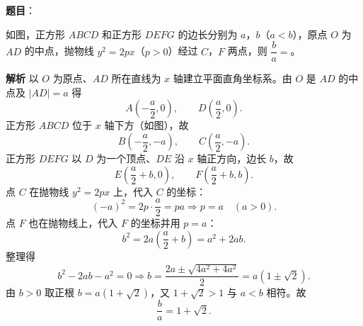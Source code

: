 \begin{answer}

\textbf{题目}：

如图，正方形 $ABCD$ 和正方形 $DEFG$ 的边长分别为 $a$，$b$（$a<b$），原点 $O$ 为 $AD$ 的中点，抛物线 $y^2=2px$（$p>0$）经过 $C$，$F$ 两点，则 $\dfrac ba=$\gkblank{}。
\nopagebreak[4]
\begin{center}\end{center}
\nopagebreak[4]
\textbf{解析}
以 $O$ 为原点、$AD$ 所在直线为 $x$ 轴建立平面直角坐标系。由 $O$ 是 $AD$ 的中点及 $|AD|=a$ 得
\nopagebreak[4]
\[A\left(-\frac a2,0\right),\qquad D\left(\frac a2,0\right).\]
正方形 $ABCD$ 位于 $x$ 轴下方（如图），故
\nopagebreak[4]
\[B\left(-\frac a2,-a\right),\qquad C\left(\frac a2,-a\right).\]
正方形 $DEFG$ 以 $D$ 为一个顶点、$DE$ 沿 $x$ 轴正方向，边长 $b$，故
\nopagebreak[4]
\[E\left(\frac a2+b,0\right),\qquad F\left(\frac a2+b,b\right).\]
点 $C$ 在抛物线 $y^2=2px$ 上，代入 $C$ 的坐标：
\nopagebreak[4]
\[(-a)^2=2p\cdot\frac a2=pa\Longrightarrow p=a\quad(a>0).\]
点 $F$ 也在抛物线上，代入 $F$ 的坐标并用 $p=a$：
\nopagebreak[4]
\[b^2=2a\left(\frac a2+b\right)=a^2+2ab .\]
整理得
\nopagebreak[4]
\[b^2-2ab-a^2=0\Longrightarrow b=\frac{2a\pm\sqrt{4a^2+4a^2}}2=a\left(1\pm\sqrt2\right).\]
由 $b>0$ 取正根 $b=a(1+\sqrt2)$，又 $1+\sqrt2>1$ 与 $a<b$ 相符。故
\nopagebreak[4]
\[\frac ba=1+\sqrt2 .\]


\end{answer}
